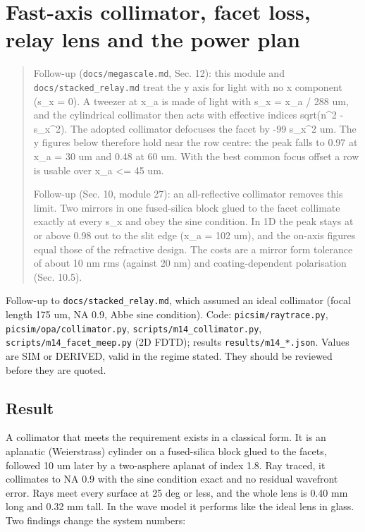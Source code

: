 \hypertarget{fast-axis-collimator-facet-loss-relay-lens-and-the-power-plan}{%
\chapter{Fast-axis collimator, facet loss, relay lens and the power
plan}\label{collimator-fast-axis-collimator-facet-loss-relay-lens-and-the-power-plan}}

\begin{quote}
Follow-up (\texttt{docs/megascale.md}, Sec. 12): this module and
\texttt{docs/stacked\_relay.md} treat the y axis for light with no x
component (s\_x = 0). A tweezer at x\_a is made of light with s\_x =
x\_a / 288 um, and the cylindrical collimator then acts with effective
indices sqrt(n\^{}2 - s\_x\^{}2). The adopted collimator defocuses the
facet by -99 s\_x\^{}2 um. The y figures below therefore hold near the
row centre: the peak falls to 0.97 at x\_a = 30 um and 0.48 at 60 um.
With the best common focus offset a row is usable over
\textbar x\_a\textbar{} \textless= 45 um.

Follow-up (Sec. 10, module 27): an all-reflective collimator removes
this limit. Two mirrors in one fused-silica block glued to the facet
collimate exactly at every s\_x and obey the sine condition. In 1D the
peak stays at or above 0.98 out to the slit edge (x\_a = 102 um), and
the on-axis figures equal those of the refractive design. The costs are
a mirror form tolerance of about 10 nm rms (against 20 nm) and
coating-dependent polarisation (Sec. 10.5).
\end{quote}

Follow-up to \texttt{docs/stacked\_relay.md}, which assumed an ideal
collimator (focal length 175 um, NA 0.9, Abbe sine condition). Code:
\texttt{picsim/raytrace.py}, \texttt{picsim/opa/collimator.py},
\texttt{scripts/m14\_collimator.py},
\texttt{scripts/m14\_facet\_meep.py} (2D FDTD); results
\texttt{results/m14\_*.json}. Values are SIM or DERIVED, valid in the
regime stated. They should be reviewed before they are quoted.

\hypertarget{1-result}{%
\section{Result}\label{collimator-1-result}}

A collimator that meets the requirement exists in a classical form. It
is an aplanatic (Weierstrass) cylinder on a fused-silica block glued to
the facets, followed 10 um later by a two-asphere aplanat of index 1.8.
Ray traced, it collimates to NA 0.9 with the sine condition exact and no
residual wavefront error. Rays meet every surface at 25 deg or less, and
the whole lens is 0.40 mm long and 0.32 mm tall. In the wave model it
performs like the ideal lens in glass. Two findings change the system
numbers:

